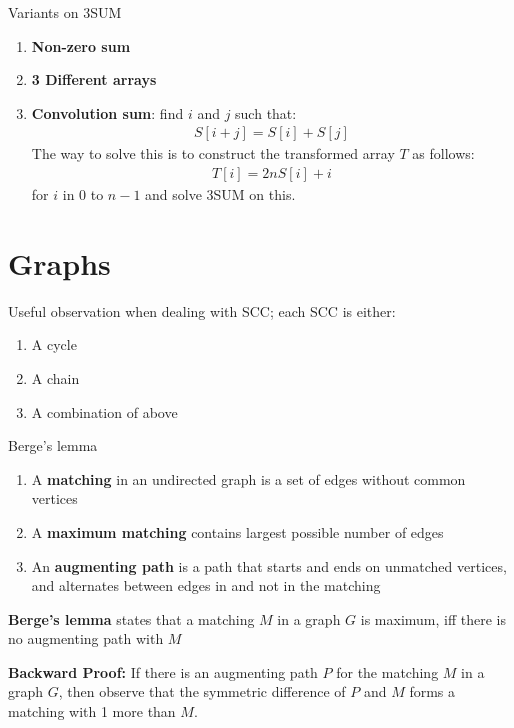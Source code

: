\documentclass[titlepage, 12pt]{book}
\begin{document}
Variants on 3SUM

\begin{enumerate}
    \item \textbf{Non-zero sum}
    \item \textbf{3 Different arrays}
    \item \textbf{Convolution sum}: find $i$ and $j$ such that:
        \begin{align*}
            S[i + j] = S[i] + S[j]
        \end{align*}
        The way to solve this is to construct the transformed array $T$ as
        follows:
        \begin{align*}
            T[i] = 2nS[i] + i
        \end{align*}
        for $i$ in 0 to $n - 1$ and solve 3SUM on this.
\end{enumerate}

\chapter{Graphs}

Useful observation when dealing with SCC; each SCC is either:
\begin{enumerate}
  \item A cycle
  \item A chain
  \item A combination of above
\end{enumerate}

\begin{theorem}{Berge's lemma}{}
    \begin{enumerate}
        \item A \textbf{matching} in an undirected graph is a set of edges without
            common vertices
        \item A \textbf{maximum matching} contains largest possible number of edges
        \item An \textbf{augmenting path} is a path that starts and ends on
            unmatched vertices, and alternates between edges in and not in the
            matching
    \end{enumerate}
    \textbf{Berge's lemma} states that a matching $M$ in a graph $G$ is maximum,
    iff there is no augmenting path with $M$
\end{theorem}
\textbf{Backward Proof:}
If there is an augmenting path $P$ for the matching $M$ in a graph $G$, then
observe that the symmetric difference of $P$ and $M$ forms a matching with 1
more than $M$.
\end{document}
